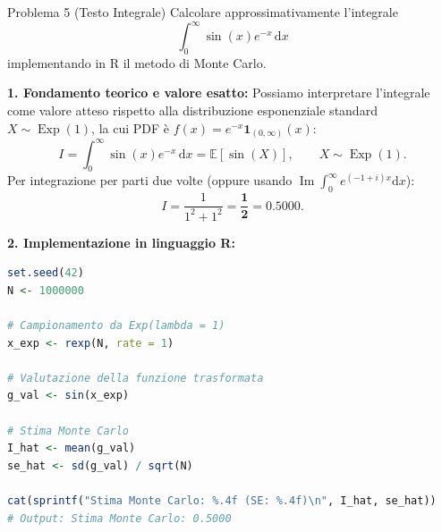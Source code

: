 \documentclass[11pt,a4paper]{article}
\newcommand{\EE}{\mathbb{E}}
\newcommand{\dx}{\mathrm{d}x}
\begin{document}
\begin{problemabox}{Problema 5 (Testo Integrale)}
Calcolare approssimativamente l'integrale
\[
\int_0^\infty \sin(x) e^{-x} \, \dx
\]
implementando in R il metodo di Monte Carlo.
\end{problemabox}

\begin{soluzionebox}
\textbf{1. Fondamento teorico e valore esatto:}
Possiamo interpretare l'integrale come valore atteso rispetto alla distribuzione esponenziale standard $X \sim \operatorname{Exp}(1)$, la cui PDF è $f(x) = e^{-x} \mathbf{1}_{(0, \infty)}(x)$:
\[
I = \int_0^\infty \sin(x) e^{-x} \, \dx = \EE[\sin(X)], \qquad X \sim \operatorname{Exp}(1).
\]
Per integrazione per parti due volte (oppure usando $\operatorname{Im}\int_0^\infty e^{(-1+i)x} \dx$):
\[
I = \frac{1}{1^2 + 1^2} = \bm{\frac{1}{2}} = \bm{0.5000}.
\]

\textbf{2. Implementazione in linguaggio R:}
\begin{lstlisting}[language=R]
set.seed(42)
N <- 1000000

# Campionamento da Exp(lambda = 1)
x_exp <- rexp(N, rate = 1)

# Valutazione della funzione trasformata
g_val <- sin(x_exp)

# Stima Monte Carlo
I_hat <- mean(g_val)
se_hat <- sd(g_val) / sqrt(N)

cat(sprintf("Stima Monte Carlo: %.4f (SE: %.4f)\n", I_hat, se_hat))
# Output: Stima Monte Carlo: 0.5000
\end{lstlisting}
\end{soluzionebox}
\end{document}
